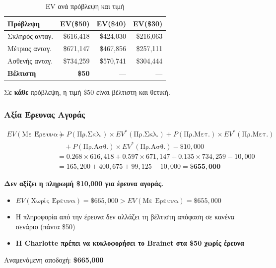 \documentclass[a4paper,12pt]{article}
\begin{document}
\begin{table}[H]
\centering
\begin{tabular}{l|rrr}
\toprule
\textbf{Πρόβλεψη} & \textbf{EV(\$50)} & \textbf{EV(\$40)} & \textbf{EV(\$30)} \\
\midrule
Σκληρός ανταγ. & \$616,418 & \$424,030 & \$216,063 \\
Μέτριος ανταγ. & \$671,147 & \$467,856 & \$257,111 \\
Ασθενής ανταγ. & \$734,259 & \$570,741 & \$304,444 \\
\midrule
\textbf{Βέλτιστη} & \textbf{\$50} & --- & --- \\
\bottomrule
\end{tabular}
\caption{EV ανά πρόβλεψη και τιμή}
\end{table}

Σε \textbf{κάθε} πρόβλεψη, η τιμή \$50 είναι βέλτιστη και θετική.

\subsubsection{Αξία Έρευνας Αγοράς}

\begin{align}
EV(\text{Με Έρευνα}) &= P(\text{Πρ.Σκλ.}) \times EV^*(\text{Πρ.Σκλ.}) + P(\text{Πρ.Μετ.}) \times EV^*(\text{Πρ.Μετ.}) \nonumber \\
&\quad + P(\text{Πρ.Ασθ.}) \times EV^*(\text{Πρ.Ασθ.}) - \$10{,}000 \nonumber \\
&= 0.268 \times 616{,}418 + 0.597 \times 671{,}147 + 0.135 \times 734{,}259 - 10{,}000 \nonumber \\
&= 165{,}200 + 400{,}675 + 99{,}125 - 10{,}000 = \mathbf{\$655{,}000}
\end{align}

\begin{tcolorbox}[colback=green!10, colframe=decisiongreen, title=Βέλτιστη Πολιτική -- Cerebrosoft]
\textbf{Δεν αξίζει η πληρωμή \$10,000 για έρευνα αγοράς.}
\begin{itemize}
    \item $EV(\text{Χωρίς Έρευνα}) = \$665{,}000 > EV(\text{Με Έρευνα}) = \$655{,}000$
    \item Η πληροφορία από την έρευνα δεν αλλάζει τη βέλτιστη απόφαση σε κανένα σενάριο (πάντα \$50)
    \item \textbf{Η Charlotte πρέπει να κυκλοφορήσει το Brainet στα \$50 χωρίς έρευνα}
\end{itemize}
Αναμενόμενη αποδοχή: \textbf{\$665,000}
\end{tcolorbox}
\end{document}
